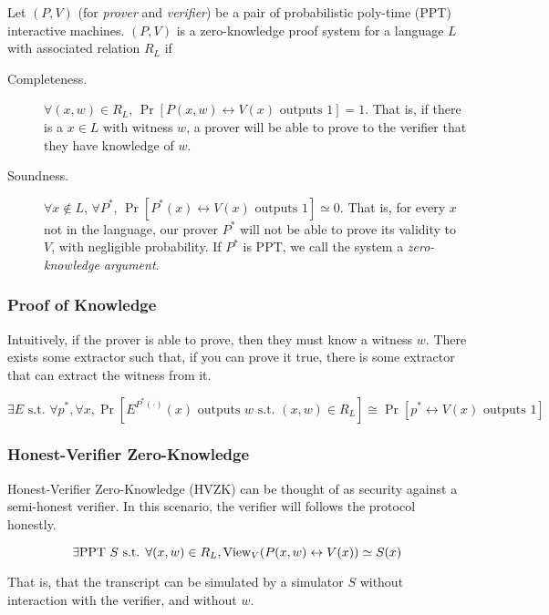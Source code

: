 \begin{definition}
    Let $(P, V)$ (for \emph{prover} and \emph{verifier}) be a pair of probabilistic poly-time (PPT) interactive machines. $(P, V)$ is a zero-knowledge proof system for a language $L$ with associated relation $R_L$ if
    \begin{description}
        \item[Completeness.] $\forall (x, w)\in R_L$, $\Pr[P(x, w) \leftrightarrow V(x) \text{ outputs }1] = 1$. That is, if there is a $x\in L$ with witness $w$, a prover will be able to prove to the verifier that they have knowledge of $w$.
        \item[Soundness.] $\forall x\not\in L$, $\forall P^*$, $\Pr[P^*(x) \leftrightarrow V(x)\text{ outputs }1]\simeq 0$. That is, for every $x$ not in the language, our prover $P^*$ will not be able to prove its validity to $V$, with negligible probability. If $P^*$ is PPT, we call the system a \emph{zero-knowledge argument}.
    \end{description}

\end{definition}

\subsubsection{Proof of Knowledge}

Intuitively, if the prover is able to prove, then they must know a witness $w$. There exists some extractor such that, if you can prove it true, there is some extractor that can extract the witness from it.

\[ \exists E \text{ s.t. } \forall p^*, \forall x, \Pr[E^{P^*(\cdot)}(x) \text{ outputs }w \text{ s.t. }(x, w) \in R_L] \cong \Pr[p^* \leftrightarrow V(x) \text{ outputs } 1]\]


\subsubsection{Honest-Verifier Zero-Knowledge}
Honest-Verifier Zero-Knowledge (HVZK) can be thought of as security against a semi-honest verifier. In this scenario, the verifier will follows the protocol honestly.

\[\exists\mathrm{PPT}\ S\text{ s.t. }\forall(x, w)\in R_L, \mathrm{View}_V(P(x, w)\leftrightarrow V(x))\simeq S(x)\]

That is, that the transcript can be simulated by a simulator $S$ without interaction with the verifier, and without $w$.

